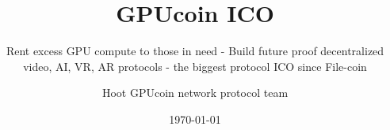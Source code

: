 



\usepackage{appendixnumberbeamer}
\usepackage[T1]{fontenc}
\usepackage[utf8]{inputenc}
\usepackage{tikz} 

\usepackage{booktabs}
\usepackage[scale=2]{ccicons}


\usepackage{xspace}
\usepackage{tabularx}
\renewcommand\tabularxcolumn[1]{m{#1}}%
\usepackage{adjustbox}




\title{ GPUcoin ICO }
\subtitle{Rent excess GPU compute to those in need - Build future proof decentralized video, AI, VR, AR protocols - the biggest protocol ICO since File-coin}
\date{\today}
\author{Hoot GPUcoin network protocol team}


\maketitle


